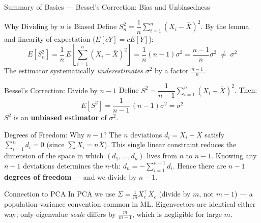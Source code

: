 \documentclass{beamer}
\begin{document}
\begin{frame}[shrink=45]{Summary of Basics --- Bessel's Correction: Bias and Unbiasedness}
  \begin{block}{Why Dividing by $n$ is Biased}
    Define $S_n^2 = \dfrac{1}{n}\sum_{i=1}^n(X_i - \bar{X})^2$.
    By the lemma and linearity of expectation ($E[cY] = cE[Y]$):
    \[
      E[S_n^2]
        = \frac{1}{n}\,E\!\left[\sum_{i=1}^n(X_i-\bar{X})^2\right]
        = \frac{1}{n}(n-1)\sigma^2
        = \frac{n-1}{n}\sigma^2
        \;\neq\; \sigma^2
    \]
    The estimator systematically \emph{underestimates} $\sigma^2$
    by a factor $\frac{n-1}{n}$.
  \end{block}

  \begin{block}{Bessel's Correction: Divide by $n-1$}
    Define $S^2 = \dfrac{1}{n-1}\sum_{i=1}^n(X_i-\bar{X})^2$.
    Then:
    \[
      E[S^2]
        = \frac{1}{n-1}\,(n-1)\sigma^2
        = \sigma^2
    \]
    $S^2$ is an \textbf{unbiased estimator} of $\sigma^2$.
  \end{block}

  \begin{block}{Degrees of Freedom: Why $n-1$?}
    The $n$ deviations $d_i = X_i - \bar{X}$ satisfy
    $\sum_{i=1}^n d_i = 0$ (since $\sum X_i = n\bar{X}$).
    This single linear constraint reduces the dimension of the
    space in which $(d_1,\ldots,d_n)$ lives from $n$ to $n-1$.
    Knowing any $n-1$ deviations determines the $n$-th:
    $d_n = -\sum_{i=1}^{n-1}d_i$.
    Hence there are $n-1$ \textbf{degrees of freedom} ---
    and we divide by $n-1$.
  \end{block}

  \begin{alertblock}{Connection to PCA}
    In PCA we use $\Sigma = \frac{1}{m}X_c^\top X_c$ (divide by $m$,
    not $m-1$) --- a population-variance convention common in ML.
    Eigenvectors are identical either way; only eigenvalue \emph{scale}
    differs by $\frac{m}{m-1}$, which is negligible for large $m$.
  \end{alertblock}
\end{frame}
\end{document}
